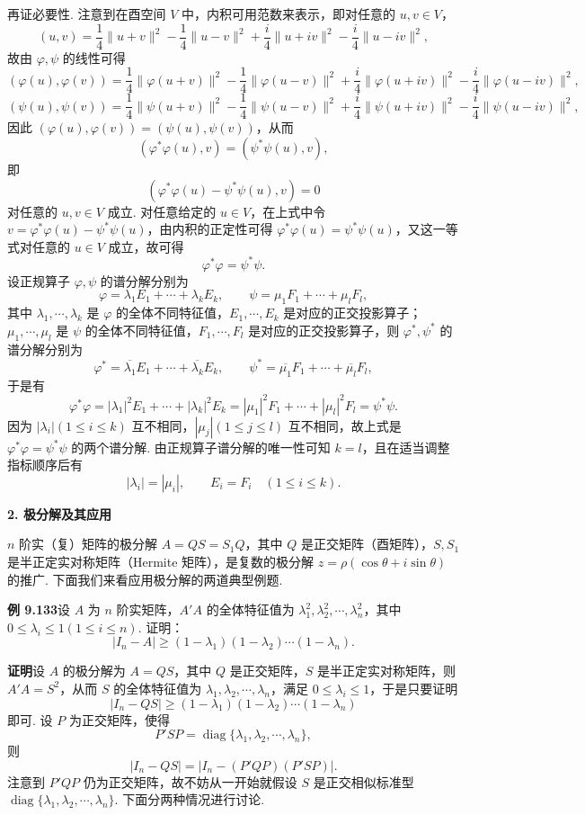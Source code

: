 \documentclass[UTF8,12pt,a4paper,fontset=fandol]{ctexart}
\begin{document}
再证必要性. 注意到在酉空间 $V$ 中，内积可用范数来表示，即对任意的 $u,v\in V$，
\[
(u,v)=\frac{1}{4}\|u+v\|^2-\frac{1}{4}\|u-v\|^2+\frac{i}{4}\|u+iv\|^2-\frac{i}{4}\|u-iv\|^2,
\]
故由 $\varphi,\psi$ 的线性可得
\[
(\varphi(u),\varphi(v))=\frac{1}{4}\|\varphi(u+v)\|^2-\frac{1}{4}\|\varphi(u-v)\|^2+\frac{i}{4}\|\varphi(u+iv)\|^2-\frac{i}{4}\|\varphi(u-iv)\|^2,
\]
\[
(\psi(u),\psi(v))=\frac{1}{4}\|\psi(u+v)\|^2-\frac{1}{4}\|\psi(u-v)\|^2+\frac{i}{4}\|\psi(u+iv)\|^2-\frac{i}{4}\|\psi(u-iv)\|^2,
\]
因此 $(\varphi(u),\varphi(v))=(\psi(u),\psi(v))$，从而
\[
(\varphi^*\varphi(u),v)=(\psi^*\psi(u),v),
\]
即
\[
(\varphi^*\varphi(u)-\psi^*\psi(u),v)=0
\]
对任意的 $u,v\in V$ 成立. 对任意给定的 $u\in V$，在上式中令 $v=\varphi^*\varphi(u)-\psi^*\psi(u)$，由内积的正定性可得 $\varphi^*\varphi(u)=\psi^*\psi(u)$，又这一等式对任意的 $u\in V$ 成立，故可得
\[
\varphi^*\varphi=\psi^*\psi.
\]
设正规算子 $\varphi,\psi$ 的谱分解分别为
\[
\varphi=\lambda_1E_1+\cdots+\lambda_kE_k,\qquad
\psi=\mu_1F_1+\cdots+\mu_lF_l,
\]
其中 $\lambda_1,\cdots,\lambda_k$ 是 $\varphi$ 的全体不同特征值，$E_1,\cdots,E_k$ 是对应的正交投影算子；$\mu_1,\cdots,\mu_l$ 是 $\psi$ 的全体不同特征值，$F_1,\cdots,F_l$ 是对应的正交投影算子，则 $\varphi^*,\psi^*$ 的谱分解分别为
\[
\varphi^*=\overline{\lambda_1}E_1+\cdots+\overline{\lambda_k}E_k,\qquad
\psi^*=\overline{\mu_1}F_1+\cdots+\overline{\mu_l}F_l,
\]
于是有
\[
\varphi^*\varphi=|\lambda_1|^2E_1+\cdots+|\lambda_k|^2E_k=|\mu_1|^2F_1+\cdots+|\mu_l|^2F_l=\psi^*\psi.
\]
因为 $|\lambda_i|(1\le i\le k)$ 互不相同，$|\mu_j|(1\le j\le l)$ 互不相同，故上式是 $\varphi^*\varphi=\psi^*\psi$ 的两个谱分解. 由正规算子谱分解的唯一性可知 $k=l$，且在适当调整指标顺序后有
\[
|\lambda_i|=|\mu_i|,\qquad E_i=F_i\quad (1\le i\le k).
\]

\noindent\textbf{2. 极分解及其应用}

$n$ 阶实（复）矩阵的极分解 $A=QS=S_1Q$，其中 $Q$ 是正交矩阵（酉矩阵），$S,S_1$ 是半正定实对称矩阵（Hermite 矩阵），是复数的极分解 $z=\rho(\cos\theta+i\sin\theta)$ 的推广. 下面我们来看应用极分解的两道典型例题.

\noindent\textbf{例 9.133}\quad 设 $A$ 为 $n$ 阶实矩阵，$A'A$ 的全体特征值为 $\lambda_1^2,\lambda_2^2,\cdots,\lambda_n^2$，其中 $0\le\lambda_i\le1(1\le i\le n)$. 证明：
\[
|I_n-A|\ge(1-\lambda_1)(1-\lambda_2)\cdots(1-\lambda_n).
\]

\noindent\textbf{证明}\quad 设 $A$ 的极分解为 $A=QS$，其中 $Q$ 是正交矩阵，$S$ 是半正定实对称矩阵，则 $A'A=S^2$，从而 $S$ 的全体特征值为 $\lambda_1,\lambda_2,\cdots,\lambda_n$，满足 $0\le\lambda_i\le1$，于是只要证明
\[
|I_n-QS|\ge(1-\lambda_1)(1-\lambda_2)\cdots(1-\lambda_n)
\]
即可. 设 $P$ 为正交矩阵，使得
\[
P'SP=\operatorname{diag}\{\lambda_1,\lambda_2,\cdots,\lambda_n\},
\]
则
\[
|I_n-QS|=|I_n-(P'QP)(P'SP)|.
\]
注意到 $P'QP$ 仍为正交矩阵，故不妨从一开始就假设 $S$ 是正交相似标准型 $\operatorname{diag}\{\lambda_1,\lambda_2,\cdots,\lambda_n\}$. 下面分两种情况进行讨论.
\end{document}
